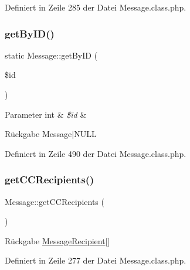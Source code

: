 Definiert in Zeile 285 der Datei Message.\+class.\+php.

\mbox{\label{class_message_a032f1d597ab27c54755d0ca84da767ee}} 
\subsubsection{\texorpdfstring{get\+By\+I\+D()}{getByID()}}
{\footnotesize\ttfamily static Message\+::get\+By\+ID (\begin{DoxyParamCaption}\item[{}]{\$id }\end{DoxyParamCaption})\hspace{0.3cm}{\ttfamily [static]}}


\begin{DoxyParams}[1]{Parameter}
int & {\em \$id} & \\
\hline
\end{DoxyParams}
\begin{DoxyReturn}{Rückgabe}
Message$\vert$\+N\+U\+LL 
\end{DoxyReturn}


Definiert in Zeile 490 der Datei Message.\+class.\+php.

\mbox{\label{class_message_acc65cd5970cbd169390f3b69bdaf6792}} 
\subsubsection{\texorpdfstring{get\+C\+C\+Recipients()}{getCCRecipients()}}
{\footnotesize\ttfamily Message\+::get\+C\+C\+Recipients (\begin{DoxyParamCaption}{ }\end{DoxyParamCaption})}

\begin{DoxyReturn}{Rückgabe}
\mbox{\hyperlink{class_message_recipient}{Message\+Recipient}}\mbox{[}\mbox{]} 
\end{DoxyReturn}


Definiert in Zeile 277 der Datei Message.\+class.\+php.

\mbox{\label{class_message_a82121e53141914ccf19a03e8db408c09}} 
